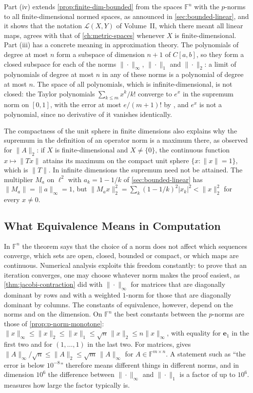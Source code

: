 Part (iv) extends \cref{prop:finite-dim-bounded} from the spaces $\mathbb F^n$ with the $p$-norms to all finite-dimensional normed spaces, as announced in \cref{sec:bounded-linear}, and it shows that the notation $\mathcal L(X,Y)$ of Volume~II, which there meant all linear maps, agrees with that of \cref{ch:metric-spaces} whenever $X$ is finite-dimensional. Part (iii) has a concrete meaning in approximation theory. The polynomials of degree at most $n$ form a subspace of dimension $n+1$ of $C[a,b]$, so they form a closed subspace for each of the norms $\|\cdot\|_\infty$, $\|\cdot\|_1$ and $\|\cdot\|_2$: a limit of polynomials of degree at most $n$ in any of these norms is a polynomial of degree at most $n$. The space of all polynomials, which is infinite-dimensional, is not closed: the Taylor polynomials $\sum_{k\le m}x^k/k!$ converge to $e^x$ in the supremum norm on $[0,1]$, with the error at most $e/(m+1)!$ by , and $e^x$ is not a polynomial, since no derivative of it vanishes identically.

The compactness of the unit sphere in finite dimensions also explains why the supremum in the definition of an operator norm is a maximum there, as  observed for $\|A\|_2$: if $X$ is finite-dimensional and $X\ne\{0\}$, the continuous function $x\mapsto\|Tx\|$ attains its maximum on the compact unit sphere $\{x: \|x\|=1\}$, which is $\|T\|$. In infinite dimensions the supremum need not be attained. The multiplier $M_a$ on $\ell^2$ with $a_k=1-1/k$ of \cref{sec:bounded-linear} has $\|M_a\|=\|a\|_\infty=1$, but $\|M_ax\|_2^2=\sum_k(1-1/k)^2|x_k|^2<\|x\|_2^2$ for every $x\ne0$.

\subsection{What Equivalence Means in Computation}

In $\mathbb F^n$ the theorem says that the choice of a norm does not affect which sequences converge, which sets are open, closed, bounded or compact, or which maps are continuous. Numerical analysis exploits this freedom constantly: to prove that an iteration converges, one may choose whatever norm makes the proof easiest, as \cref{thm:jacobi-contraction} did with $\|\cdot\|_\infty$ for matrices that are diagonally dominant by rows and with a weighted $1$-norm for those that are diagonally dominant by columns. The constants of equivalence, however, depend on the norms and on the dimension. On $\mathbb F^n$ the best constants between the $p$-norms are those of \cref{prop:p-norm-monotone}: $\|x\|_\infty\le\|x\|_2\le\|x\|_1\le\sqrt n\,\|x\|_2\le n\|x\|_\infty$, with equality for $\mathbf e_1$ in the first two and for $(1,\ldots,1)$ in the last two. For matrices,  gives $\|A\|_\infty/\sqrt n\le\|A\|_2\le\sqrt m\,\|A\|_\infty$ for $A\in\mathbb F^{m\times n}$. A statement such as ``the error is below $10^{-8}$'' therefore means different things in different norms, and in dimension $10^6$ the difference between $\|\cdot\|_\infty$ and $\|\cdot\|_1$ is a factor of up to $10^6$.  measures how large the factor typically is.


